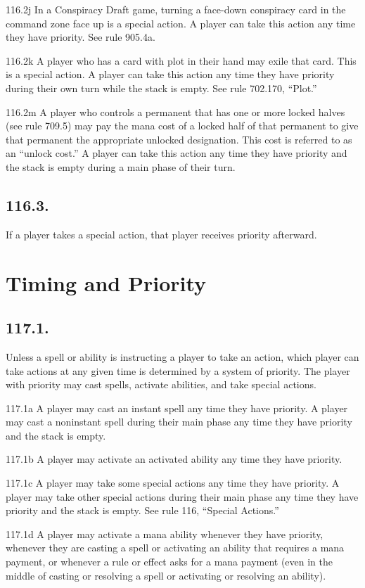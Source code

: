 116.2j In a Conspiracy Draft game, turning a face-down conspiracy card in the command zone face up is a special action. A player can take this action any time they have priority. See rule 905.4a.

116.2k A player who has a card with plot in their hand may exile that card. This is a special action. A player can take this action any time they have priority during their own turn while the stack is empty. See rule 702.170, “Plot.”

116.2m A player who controls a permanent that has one or more locked halves (see rule 709.5) may pay the mana cost of a locked half of that permanent to give that permanent the appropriate unlocked designation. This cost is referred to as an “unlock cost.” A player can take this action any time they have priority and the stack is empty during a main phase of their turn.

\subsection*{116.3.}
If a player takes a special action, that player receives priority afterward.

\section{Timing and Priority}
\subsection*{117.1.}
Unless a spell or ability is instructing a player to take an action, which player can take actions at any given time is determined by a system of priority. The player with priority may cast spells, activate abilities, and take special actions.

117.1a A player may cast an instant spell any time they have priority. A player may cast a noninstant spell during their main phase any time they have priority and the stack is empty.

117.1b A player may activate an activated ability any time they have priority.

117.1c A player may take some special actions any time they have priority. A player may take other special actions during their main phase any time they have priority and the stack is empty. See rule 116, “Special Actions.”

117.1d A player may activate a mana ability whenever they have priority, whenever they are casting a spell or activating an ability that requires a mana payment, or whenever a rule or effect asks for a mana payment (even in the middle of casting or resolving a spell or activating or resolving an ability).

